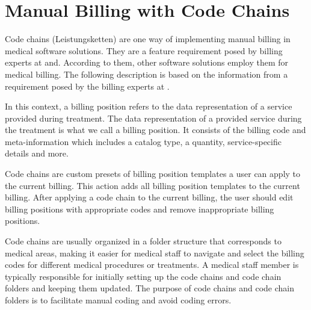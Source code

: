 \section{Manual Billing with Code Chains}\label{sec:billing-positions-and-code-chains}
Code chains (Leistungsketten) are one way of implementing manual billing in medical software solutions.
They are a feature requirement posed by billing experts at \AV and.
According to them, other software solutions employ them for medical billing.
The following description is based on the information from a requirement posed by the billing experts at \AV.

In this context, a billing position refers to the data representation of a service provided during treatment.
The data representation of a provided service during the treatment is what we call a billing position.
It consists of the billing code and meta-information which includes a catalog type, a quantity, service-specific details and more.

Code chains are custom presets of billing position templates a user can apply to the current billing.
This action adds all billing position templates to the current billing.
After applying a code chain to the current billing, the user should edit billing positions with appropriate codes and remove inappropriate billing positions.

Code chains are usually organized in a folder structure that corresponds to medical areas,
making it easier for medical staff to navigate and select the billing codes for different medical procedures or treatments.
A medical staff member is typically responsible for initially setting up the code chains and code chain folders and keeping them updated.
The purpose of code chains and code chain folders is to facilitate manual coding and avoid coding errors.
